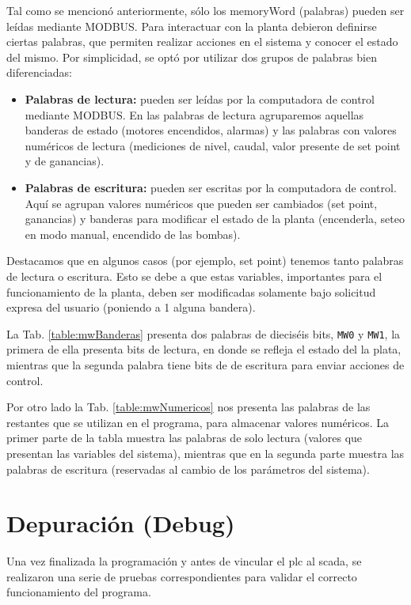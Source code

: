 Tal como se mencionó anteriormente, sólo los \gls{memoryWord} (palabras) pueden
ser leídas mediante MODBUS.
Para interactuar con la planta debieron definirse ciertas palabras, que
permiten realizar acciones en el sistema y conocer el estado del mismo.
Por simplicidad, se optó por utilizar dos grupos de palabras bien
diferenciadas:
\begin{itemize}
 \item \textbf{Palabras de lectura:} pueden ser leídas por la computadora de
control mediante MODBUS. En las palabras de lectura agruparemos aquellas
banderas de estado (motores encendidos, alarmas) y las palabras con valores
numéricos de lectura (mediciones de nivel, caudal, valor presente de set point
y de ganancias).
 \item \textbf{Palabras de escritura:} pueden ser escritas por la computadora
de control. Aquí se agrupan valores numéricos que pueden ser cambiados (set
point, ganancias) y banderas para modificar el estado de la planta (encenderla,
seteo en modo manual, encendido de las bombas).
\end{itemize}

Destacamos que en algunos casos (por ejemplo, set point) tenemos tanto palabras
de lectura o escritura.
Esto se debe a que estas variables, importantes para el funcionamiento de la
planta, deben ser modificadas solamente bajo solicitud expresa del usuario
(poniendo a 1 alguna bandera).

La Tab. \ref{table:mwBanderas} presenta dos palabras de dieciséis
bits, \verb|MW0| y \verb|MW1|, la primera de ella presenta bits de lectura, en
donde se
refleja el estado del la plata, mientras que la segunda palabra tiene bits de
de escritura para enviar acciones de control.

Por otro lado la Tab. \ref{table:mwNumericos} nos presenta
las palabras de las restantes que se utilizan en el programa, para
almacenar valores numéricos.
La primer parte de la tabla muestra las palabras de solo lectura (valores que
presentan las variables del sistema), mientras que en la
segunda parte muestra las palabras de escritura (reservadas al cambio
de los parámetros del sistema).

\section{Depuración (Debug)}
\label{sec:Debug}

Una vez finalizada la programación y antes de vincular el \gls{plc}
al \gls{scada}, se realizaron una serie de pruebas correspondientes para
validar el correcto funcionamiento del programa.


